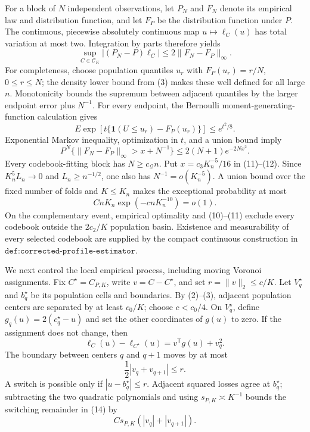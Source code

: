 For a block of \(N\) independent observations, let \(P_N\) and \(F_N\) denote its empirical law and distribution function, and let \(F_P\) be the distribution function under \(P\).  The continuous, piecewise absolutely continuous map \(u\mapsto\ell_C(u)\) has total variation at most two.  Integration by parts therefore yields
\[
 \sup_{C\in\mathcal C_K}|(P_N-P)\ell_C|\leq2\|F_N-F_P\|_\infty.            \tag{11}
\]
For completeness, choose population quantiles \(u_r\) with \(F_P(u_r)=r/N\), \(0\leq r\leq N\); the density lower bound from (3) makes these well defined for all large \(n\).  Monotonicity bounds the supremum between adjacent quantiles by the larger endpoint error plus \(N^{-1}\).  For every endpoint, the Bernoulli moment-generating-function calculation gives
\[
 E\exp[t\{\mathbf1(U\leq u_r)-F_P(u_r)\}]\leq e^{t^2/8}.
\]
Exponential Markov inequality, optimization in \(t\), and a union bound imply
\[
 P^N\{\|F_N-F_P\|_\infty>x+N^{-1}\}\leq2(N+1)e^{-2Nx^2}.                  \tag{12}
\]
Every codebook-fitting block has \(N\geq c_{\mathcal Q}n\).  Put \(x=c_3K_n^{-5}/16\) in (11)--(12).  Since \(K_n^5L_n\to0\) and \(L_n\geq n^{-1/2}\), one also has \(N^{-1}=o(K_n^{-5})\).  A union bound over the fixed number of folds and \(K\leq K_n\) makes the exceptional probability at most
\[
 CnK_n\exp(-cnK_n^{-10})=o(1).                                               \tag{13}
\]
On the complementary event, empirical optimality and (10)--(11) exclude every codebook outside the \(2c_2/K\) population basin.  Existence and measurability of every selected codebook are supplied by the compact continuous construction in \(\texttt{def:corrected-profile-estimator}\).

We next control the local empirical process, including moving Voronoi assignments.  Fix \(C^\star=C_{P,K}\), write \(v=C-C^\star\), and set \(r=\|v\|_2\leq c/K\).  Let \(V_q^\star\) and \(b_q^\star\) be its population cells and boundaries.  By (2)--(3), adjacent population centers are separated by at least \(c_0/K\); choose \(c<c_0/4\).  On \(V_q^\star\), define \(g_q(u)=2(c_q^\star-u)\) and set the other coordinates of \(g(u)\) to zero.  If the assignment does not change, then
\[
 \ell_C(u)-\ell_{C^\star}(u)=v^{\mathsf T}g(u)+v_q^2.                       \tag{14}
\]
The boundary between centers \(q\) and \(q+1\) moves by at most
\[
 \frac12|v_q+v_{q+1}|\leq r.                                                 \tag{15}
\]
A switch is possible only if \(|u-b_q^\star|\leq r\).  Adjacent squared losses agree at \(b_q^\star\); subtracting the two quadratic polynomials and using \(s_{P,K}\asymp K^{-1}\) bounds the switching remainder in (14) by
\[
 Cs_{P,K}(|v_q|+|v_{q+1}|).                                                   \tag{16}
\]

